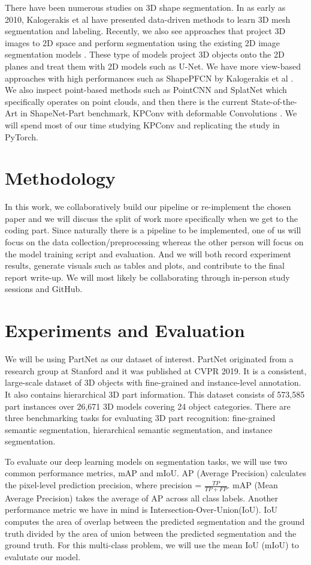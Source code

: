 \documentclass[11pt,twocolumn,letterpaper]{article}
\begin{document}
There have been numerous studies on 3D shape segmentation. In as early as 2010, Kalogerakis et al \cite{Kalogerakis_mesh_seg} have presented data-driven methods to learn 3D mesh segmentation and labeling. Recently, we also see approaches that project 3D images to 2D space and perform segmentation using the existing 2D image segmentation models \cite{lyu2020learning} . These type of models project 3D objects onto the 2D planes and treat them with 2D models such as U-Net. We have more view-based approaches with high performances such as ShapePFCN by Kalogerakis et al \cite{kalogerakis20173d}. We also inspect point-based methods such as PointCNN \cite{li2018pointcnn} and SplatNet \cite{su2018splatnet} which specifically operates on point clouds, and then there is the current State-of-the-Art in ShapeNet-Part benchmark, KPConv with deformable Convolutions \cite{thomas2019kpconv}. We will spend most of our time studying KPConv and replicating the study in PyTorch.

\section{Methodology}
In this work, we collaboratively build our pipeline or re-implement the chosen paper and we will discuss the split of work more specifically when we get to the coding part. Since naturally there is a pipeline to be implemented, one of us will focus on the data collection/preprocessing whereas the other person will focus on the model training script and evaluation. And we will both record experiment results, generate visuals such as tables and plots, and contribute to the final report write-up. We will most likely be collaborating through in-person study sessions and GitHub. 


\section{Experiments and Evaluation}


We will be using PartNet as our dataset of interest. PartNet originated from a research group at Stanford and it was published at CVPR 2019. It is a consistent, large-scale dataset of 3D objects with fine-grained and instance-level annotation. It also contains hierarchical 3D part information. This dataset consists of 573,585 part instances over 26,671 3D models covering 24 object categories. There are three benchmarking tasks for evaluating 3D part recognition: fine-grained semantic segmentation, hierarchical semantic segmentation, and instance segmentation. 

To evaluate our deep learning models on segmentation tasks, we will use two common performance metrics, mAP and mIoU. AP (Average Precision) calculates the pixel-level prediction precision, where precision = $\frac{TP}{TP + FP}$. mAP (Mean Average Precision) takes the average of AP across all class labels. Another performance metric we have in mind is Intersection-Over-Union(IoU). IoU computes the area of overlap between the predicted segmentation and the ground truth divided by the area of union between the predicted segmentation and the ground truth. For this multi-class problem, we will use the mean IoU (mIoU) to evalutate our model.


\printbibliography
\end{document}
